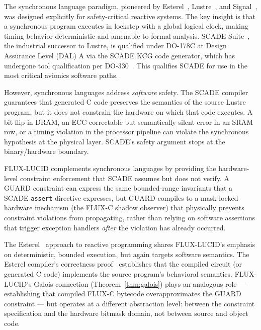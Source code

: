 \documentclass[sigplan,review,anonymous]{acmart}
\begin{document}
The synchronous language paradigm, pioneered by Esterel~\cite{berry1992esterel},
Lustre~\cite{halbwachs1991lustre}, and Signal~\cite{benveniste1991signal},
was designed explicitly for safety-critical reactive systems. The key insight
is that a synchronous program executes in lockstep with a global logical
clock, making timing behavior deterministic and amenable to formal analysis.
SCADE Suite~\cite{scade}, the industrial successor to Lustre, is qualified
under DO-178C at Design Assurance Level (DAL) A via the SCADE KCG code
generator, which has undergone tool qualification per DO-330~\cite{do330}.
This qualifies SCADE for use in the most critical avionics software paths.

However, synchronous languages address \emph{software} safety.
The SCADE compiler guarantees that generated C code preserves the semantics
of the source Lustre program, but it does not constrain the hardware on
which that code executes. A bit-flip in DRAM, an ECC-correctable but
semantically silent error in an SRAM row, or a timing violation in the
processor pipeline can violate the synchronous hypothesis at the physical
layer. SCADE's safety argument stops at the binary/hardware boundary.

FLUX-LUCID complements synchronous languages by providing the hardware-level
constraint enforcement that SCADE assumes but does not verify. A GUARD
constraint can express the same bounded-range invariants that a SCADE
\texttt{assert} directive expresses, but GUARD compiles to a mask-locked
hardware mechanism (the FLUX-C shadow observer) that physically prevents
constraint violations from propagating, rather than relying on software
assertions that trigger exception handlers \emph{after} the violation has
already occurred.

The Esterel~\cite{berry1999esterel_semantics} approach to reactive
programming shares FLUX-LUCID's emphasis on deterministic, bounded execution,
but again targets software semantics. The Esterel compiler's correctness
proof~\cite{berry1992esterel} establishes that the compiled circuit
(or generated C code) implements the source program's behavioral semantics.
FLUX-LUCID's Galois connection (Theorem~\ref{thm:galois}) plays an analogous
role — establishing that compiled FLUX-C bytecode overapproximates the GUARD
constraint — but operates at a different abstraction level: between the
constraint specification and the hardware bitmask domain, not between
source and object code.

\end{document}
